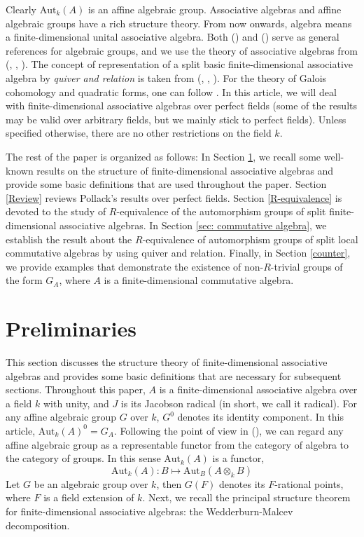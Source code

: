 \documentclass[12pt]{amsart}
\theoremstyle{definition}
\numberwithin{equation}{section}
\begin{document}
\vskip2mm
\noindent
Clearly $\text{Aut}_{k}(A)$ is an affine algebraic group. Associative algebras and affine algebraic groups have a rich structure theory. From now onwards, algebra means a finite-dimensional unital associative algebra. Both (\cite{Humphreys}) and (\cite{Springer}) serve as general references for algebraic groups, and we use the theory of associative algebras from (\cite{Pierce}, \cite{Auslander}, \cite{Curtis}). The concept of representation of a split basic finite-dimensional associative algebra by \emph{quiver and relation} is taken from (\cite{Auslander}, \cite{PG}, \cite{ISD}). For the theory of Galois cohomology and quadratic forms, one can follow \cite{KMRT}. In this article, we will deal with finite-dimensional associative algebras over perfect fields (some of the results may be valid over arbitrary fields, but we mainly stick to perfect fields). Unless specified otherwise, there are no other restrictions on the field $k$.
\vskip2mm

The rest of the paper is organized as follows: In Section \ref{sec: Preliminaries}, we recall some well-known results on the structure of finite-dimensional associative algebras and provide some basic definitions that are used throughout the paper. Section \ref{Review} reviews Pollack's results over perfect fields. Section \ref{R-equivalence} is devoted to the study of $R$-equivalence of the automorphism groups of split finite-dimensional associative algebras. In Section \ref{sec: commutative algebra}, we establish the result about the $R$-equivalence of automorphism groups of split local commutative algebras by using quiver and relation. Finally, in Section \ref{counter}, we provide examples that demonstrate the existence of non-$R$-trivial groups of the form $G_A$, where $A$ is a finite-dimensional commutative algebra.
 
\section{Preliminaries}\label{sec: Preliminaries}
\noindent
This section discusses the structure theory of finite-dimensional associative algebras and provides some basic definitions that are necessary for subsequent sections.
\vskip2mm
\noindent
Throughout this paper, $A$ is a finite-dimensional associative algebra over a field $k$ with unity, and $J$ is its Jacobson radical (in short, we call it radical). For any affine algebraic group $G$ over $k$, $G^{0}$ denotes its identity component. In this article, $\mathrm{Aut}_k(A)^{0}=G_A$. Following the point of view in (\cite{KMRT}), we can regard any affine algebraic group as a representable functor from the category of algebra to the category of groups. In this sense $\text{Aut}_k(A)$ is a functor, 
\begin{equation*}\label{eq1}
\text{Aut}_k(A): B\mapsto \text{Aut}_{B}(A\otimes_{k} B)
\end{equation*}
Let $G$ be an algebraic group over $k$, then $G(F)$ denotes its $F$-rational points, where $F$ is a field extension of $k$.
\vskip2mm
\noindent
Next, we recall the principal structure theorem for finite-dimensional associative algebras: the Wedderburn-Malcev decomposition.
\end{document}
